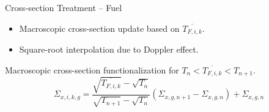 \begin{frame}{Cross-section Treatment -- Fuel}
  \begin{itemize}
    \item Macroscopic cross-section update based on $\overline{T_{F,i,k}}$.
    \item Square-root interpolation due to Doppler effect.
  \end{itemize}

  Macroscopic cross-section functionalization for ${T_n < \overline{T_{F,i,k}} <
  T_{n+1}}$.
  \begin{equation}
    \Sigma_{x,i,k,g} = 
      \frac{\sqrt{\overline{T_{F,i,k}}} - \sqrt{T_{n}}}
      {\sqrt{T_{n+1}}-\sqrt{T_{n}}}
      (\Sigma_{x,g,n+1} - \Sigma_{x,g,n})  + \Sigma_{x,g,n}
  \end{equation}
\end{frame}
